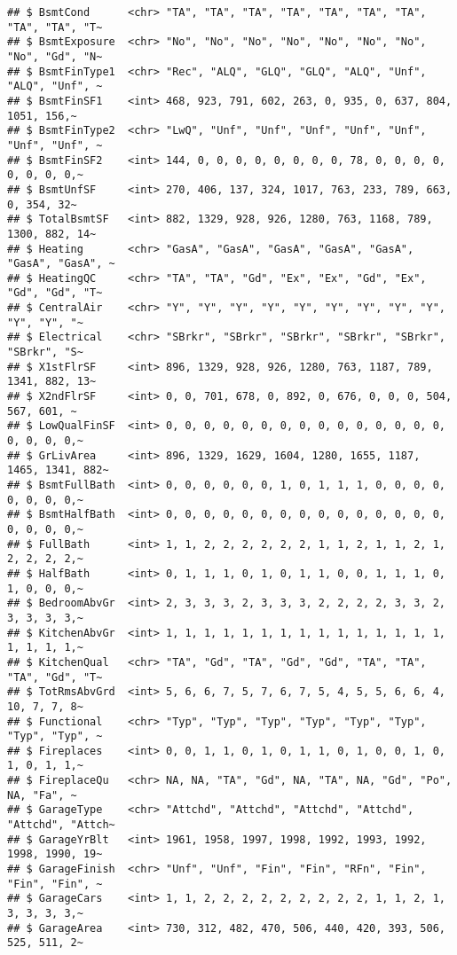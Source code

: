 \documentclass[
]{article}
\begin{document}
\begin{verbatim}
## $ BsmtCond      <chr> "TA", "TA", "TA", "TA", "TA", "TA", "TA", "TA", "TA", "T~
## $ BsmtExposure  <chr> "No", "No", "No", "No", "No", "No", "No", "No", "Gd", "N~
## $ BsmtFinType1  <chr> "Rec", "ALQ", "GLQ", "GLQ", "ALQ", "Unf", "ALQ", "Unf", ~
## $ BsmtFinSF1    <int> 468, 923, 791, 602, 263, 0, 935, 0, 637, 804, 1051, 156,~
## $ BsmtFinType2  <chr> "LwQ", "Unf", "Unf", "Unf", "Unf", "Unf", "Unf", "Unf", ~
## $ BsmtFinSF2    <int> 144, 0, 0, 0, 0, 0, 0, 0, 0, 78, 0, 0, 0, 0, 0, 0, 0, 0,~
## $ BsmtUnfSF     <int> 270, 406, 137, 324, 1017, 763, 233, 789, 663, 0, 354, 32~
## $ TotalBsmtSF   <int> 882, 1329, 928, 926, 1280, 763, 1168, 789, 1300, 882, 14~
## $ Heating       <chr> "GasA", "GasA", "GasA", "GasA", "GasA", "GasA", "GasA", ~
## $ HeatingQC     <chr> "TA", "TA", "Gd", "Ex", "Ex", "Gd", "Ex", "Gd", "Gd", "T~
## $ CentralAir    <chr> "Y", "Y", "Y", "Y", "Y", "Y", "Y", "Y", "Y", "Y", "Y", "~
## $ Electrical    <chr> "SBrkr", "SBrkr", "SBrkr", "SBrkr", "SBrkr", "SBrkr", "S~
## $ X1stFlrSF     <int> 896, 1329, 928, 926, 1280, 763, 1187, 789, 1341, 882, 13~
## $ X2ndFlrSF     <int> 0, 0, 701, 678, 0, 892, 0, 676, 0, 0, 0, 504, 567, 601, ~
## $ LowQualFinSF  <int> 0, 0, 0, 0, 0, 0, 0, 0, 0, 0, 0, 0, 0, 0, 0, 0, 0, 0, 0,~
## $ GrLivArea     <int> 896, 1329, 1629, 1604, 1280, 1655, 1187, 1465, 1341, 882~
## $ BsmtFullBath  <int> 0, 0, 0, 0, 0, 0, 1, 0, 1, 1, 1, 0, 0, 0, 0, 0, 0, 0, 0,~
## $ BsmtHalfBath  <int> 0, 0, 0, 0, 0, 0, 0, 0, 0, 0, 0, 0, 0, 0, 0, 0, 0, 0, 0,~
## $ FullBath      <int> 1, 1, 2, 2, 2, 2, 2, 2, 1, 1, 2, 1, 1, 2, 1, 2, 2, 2, 2,~
## $ HalfBath      <int> 0, 1, 1, 1, 0, 1, 0, 1, 1, 0, 0, 1, 1, 1, 0, 1, 0, 0, 0,~
## $ BedroomAbvGr  <int> 2, 3, 3, 3, 2, 3, 3, 3, 2, 2, 2, 2, 3, 3, 2, 3, 3, 3, 3,~
## $ KitchenAbvGr  <int> 1, 1, 1, 1, 1, 1, 1, 1, 1, 1, 1, 1, 1, 1, 1, 1, 1, 1, 1,~
## $ KitchenQual   <chr> "TA", "Gd", "TA", "Gd", "Gd", "TA", "TA", "TA", "Gd", "T~
## $ TotRmsAbvGrd  <int> 5, 6, 6, 7, 5, 7, 6, 7, 5, 4, 5, 5, 6, 6, 4, 10, 7, 7, 8~
## $ Functional    <chr> "Typ", "Typ", "Typ", "Typ", "Typ", "Typ", "Typ", "Typ", ~
## $ Fireplaces    <int> 0, 0, 1, 1, 0, 1, 0, 1, 1, 0, 1, 0, 0, 1, 0, 1, 0, 1, 1,~
## $ FireplaceQu   <chr> NA, NA, "TA", "Gd", NA, "TA", NA, "Gd", "Po", NA, "Fa", ~
## $ GarageType    <chr> "Attchd", "Attchd", "Attchd", "Attchd", "Attchd", "Attch~
## $ GarageYrBlt   <int> 1961, 1958, 1997, 1998, 1992, 1993, 1992, 1998, 1990, 19~
## $ GarageFinish  <chr> "Unf", "Unf", "Fin", "Fin", "RFn", "Fin", "Fin", "Fin", ~
## $ GarageCars    <int> 1, 1, 2, 2, 2, 2, 2, 2, 2, 2, 2, 1, 1, 2, 1, 3, 3, 3, 3,~
## $ GarageArea    <int> 730, 312, 482, 470, 506, 440, 420, 393, 506, 525, 511, 2~

\end{verbatim}
\end{document}
